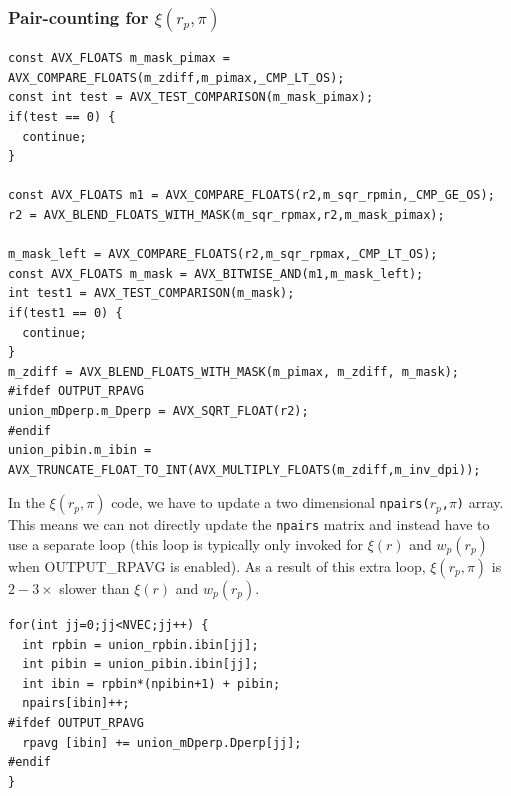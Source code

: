 \documentclass[12pt,titlepage]{article}
\newcommand{\xir}{\ensuremath{{\xi(r)}}\xspace}
\newcommand{\wprp}{\ensuremath{{w_p(r_p)}}\xspace}
\newcommand{\xirppi}{\ensuremath{{\xi(r_p,\pi)}}\xspace}
\begin{document}
\subsubsection{Pair-counting for \texorpdfstring{\xirppi}{xi(rp,pi)}}\label{section:pair_counting_rp_pi}
\begin{lstlisting}[label={code:masks_xirppi},caption={Bit-masks in \xirppi.}]
const AVX_FLOATS m_mask_pimax = AVX_COMPARE_FLOATS(m_zdiff,m_pimax,_CMP_LT_OS);
const int test = AVX_TEST_COMPARISON(m_mask_pimax);
if(test == 0) {
  continue;
}

const AVX_FLOATS m1 = AVX_COMPARE_FLOATS(r2,m_sqr_rpmin,_CMP_GE_OS);
r2 = AVX_BLEND_FLOATS_WITH_MASK(m_sqr_rpmax,r2,m_mask_pimax);

m_mask_left = AVX_COMPARE_FLOATS(r2,m_sqr_rpmax,_CMP_LT_OS);
const AVX_FLOATS m_mask = AVX_BITWISE_AND(m1,m_mask_left);
int test1 = AVX_TEST_COMPARISON(m_mask);
if(test1 == 0) {
  continue;
}
m_zdiff = AVX_BLEND_FLOATS_WITH_MASK(m_pimax, m_zdiff, m_mask);
#ifdef OUTPUT_RPAVG
union_mDperp.m_Dperp = AVX_SQRT_FLOAT(r2);
#endif
union_pibin.m_ibin = AVX_TRUNCATE_FLOAT_TO_INT(AVX_MULTIPLY_FLOATS(m_zdiff,m_inv_dpi));
\end{lstlisting}
In the \xirppi code, we have to update a two dimensional \texttt{npairs($r_p$,$\pi$)} array. This means we can not directly update 
the \texttt{npairs} matrix and instead have to use a separate loop (this loop is typically only invoked for \xir and \wprp 
when OUTPUT\_RPAVG is enabled). As a result of this extra loop, \xirppi is $2-3\times$ slower than \xir and \wprp. 

\begin{lstlisting}[label={code:updating_histogram_xirppi},caption={Updating the \texttt{npairs} matrix in \xirppi.}]
for(int jj=0;jj<NVEC;jj++) {
  int rpbin = union_rpbin.ibin[jj];
  int pibin = union_pibin.ibin[jj];
  int ibin = rpbin*(npibin+1) + pibin;
  npairs[ibin]++;
#ifdef OUTPUT_RPAVG
  rpavg [ibin] += union_mDperp.Dperp[jj];
#endif
}
\end{lstlisting}
\end{document}
